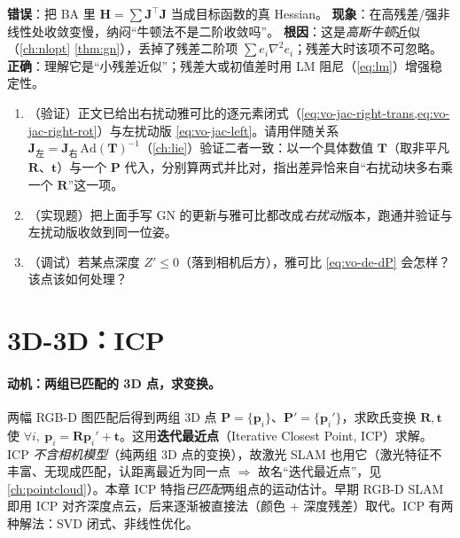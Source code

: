 \begin{pitfall}
\textbf{错误}：把 BA 里 $\mathbf{H}=\sum\mathbf{J}^\top\mathbf{J}$ 当成目标函数的真 Hessian。
\textbf{现象}：在高残差/强非线性处收敛变慢，纳闷“牛顿法不是二阶收敛吗”。
\textbf{根因}：这是\emph{高斯牛顿}近似（\cref{ch:nlopt} \cref{thm:gn}），丢掉了残差二阶项 $\sum e_i\nabla^2 e_i$；残差大时该项不可忽略。
\textbf{正确}：理解它是“小残差近似”；残差大或初值差时用 LM 阻尼（\cref{eq:lm}）增强稳定性。
\end{pitfall}

\begin{practice}
\begin{enumerate}
  \item （验证）正文已给出右扰动雅可比的逐元素闭式（\cref{eq:vo-jac-right-trans,eq:vo-jac-right-rot}）与左扰动版 \cref{eq:vo-jac-left}。请用伴随关系 $\mathbf{J}_{\text{左}}=\mathbf{J}_{\text{右}}\,\mathrm{Ad}(\mathbf{T})^{-1}$（\cref{ch:lie}）验证二者一致：以一个具体数值 $\mathbf{T}$（取非平凡 $\mathbf{R}$、$\mathbf{t}$）与一个 $\mathbf{P}$ 代入，分别算两式并比对，指出差异恰来自“右扰动块多右乘一个 $\mathbf{R}$”这一项。
  \item （实现题）把上面手写 GN 的更新与雅可比都改成\emph{右扰动}版本，跑通并验证与左扰动版收敛到同一位姿。
  \item （调试）若某点深度 $Z'\le0$（落到相机后方），雅可比 \cref{eq:vo-de-dP} 会怎样？该点该如何处理？
\end{enumerate}
\end{practice}

\section{3D-3D：ICP}
\label{sec:vo-icp}

\paragraph{动机：两组已匹配的 3D 点，求变换。}两幅 RGB-D 图匹配后得到两组 3D 点 $\mathbf{P}=\{\mathbf{p}_i\}$、$\mathbf{P}'=\{\mathbf{p}_i'\}$，求欧氏变换 $\mathbf{R},\mathbf{t}$ 使 $\forall i,\ \mathbf{p}_i=\mathbf{R}\mathbf{p}_i'+\mathbf{t}$\cite{gaoxiang2019slam14}。这用\textbf{迭代最近点}（Iterative Closest Point, ICP）求解。ICP \emph{不含相机模型}（纯两组 3D 点的变换），故激光 SLAM 也用它（激光特征不丰富、无现成匹配，认距离最近为同一点 $\Rightarrow$ 故名“迭代最近点”，见 \cref{ch:pointcloud}）。本章 ICP 特指\emph{已匹配}两组点的运动估计。早期 RGB-D SLAM 即用 ICP 对齐深度点云，后来逐渐被直接法（颜色 + 深度残差）取代\cite{carlone2026handbook}。ICP 有两种解法：SVD 闭式、非线性优化。

